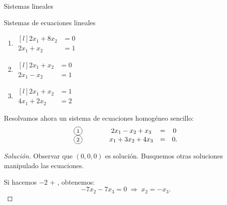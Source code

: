 \begin{chapter}{Sistemas lineales}
\begin{section}{Sistemas de ecuaciones lineales}
\begin{ejemplo*}
                \begin{multicols}{3}
                    \begin{enumerate}
                        \item $\begin{matrix*}[l]
                            2x_1 + 8x_2 &= 0 &  \\
                            2x_1 + x_2 &=  1& 
                            \end{matrix*}$
                        \item $\begin{matrix*}[l]
                            2x_1 + x_2 &= 0 &  \\
                            2x_1 - x_2 &=  1& 
                            \end{matrix*}$
                        \item $ \begin{matrix*}[l]
                            2x_1 + x_2 &= 1 &  \\
                            4x_1 +2 x_2 &=  2& 
                            \end{matrix*}$
                    \end{enumerate}
                \end{multicols}   
            \end{ejemplo*} 
            
            \begin{ejemplo}\label{ej-sist-1}
                Resolvamos ahora un sistema de ecuaciones homogéneo sencillo:
                \begin{equation*}
                \begin{matrix}
                \text{\footnotesize\circled{1}}&\qquad& 2x_1 -x_2 + x_3 &=& 0 \\
                \text{\footnotesize\circled{2}}&\qquad& x_1 + 3x_2 + 4x_3 &=& 0.
                \end{matrix}
                \end{equation*}
            \end{ejemplo}
            \begin{proof}[Solución]
                Observar que $(0,0,0)$ es solución. Busquemos otras soluciones manipulado las ecuaciones.

                Si  hacemos $-2$ \footnotesize{} $+$  {\footnotesize{}}, obtenemos: 
                $$ -7x_2 - 7x_3 = 0 \;\Rightarrow\; x_2 = -x_3.$$
                

\end{proof}
\end{section}
\end{chapter}
